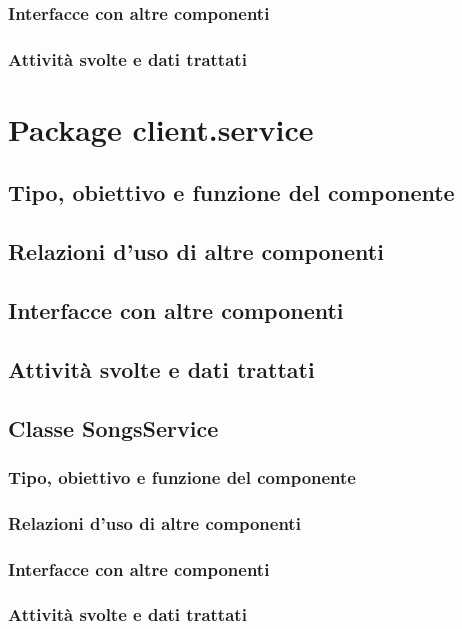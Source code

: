 \subsubsection*{Interfacce con altre componenti}
\subsubsection*{Attivit\`a svolte e dati trattati}

\newpage
\section{Package client.service} %
\subsection*{Tipo, obiettivo e funzione del componente}
\subsection*{Relazioni d'uso di altre componenti}
\subsection*{Interfacce con altre componenti}
\subsection*{Attivit\`a svolte e dati trattati}

\subsection{Classe SongsService}
\subsubsection*{Tipo, obiettivo e funzione del componente}
\subsubsection*{Relazioni d'uso di altre componenti}
\subsubsection*{Interfacce con altre componenti}
\subsubsection*{Attivit\`a svolte e dati trattati}

